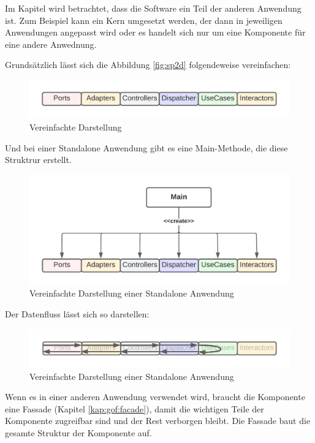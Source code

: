 Im Kapitel wird betrachtet, dass die Software ein Teil der anderen Anwendung ist.
Zum Beispiel kann ein Kern umgesetzt werden, der dann in jeweiligen Anwendungen angepasst wird 
oder es handelt sich nur um eine Komponente für eine andere Anwednung.

Grundsätzlich lässt sich die Abbildung \ref{fig:sp2d} folgendeweise vereinfachen:
\begin{figure}[H]
    \centering
    \includegraphics[width=1\textwidth]{./images/SimpliedArchitecture.png}
    \caption{Vereinfachte Darstellung}
    \label{fig:SimpliedArchitecture}
\end{figure}

Und bei einer Standalone Anwendung gibt es eine Main-Methode, die diese Struktrur erstellt.
\begin{figure}[H]
    \centering
    \includegraphics[width=1\textwidth]{./images/Architecture as Standalone.png}
    \caption{Vereinfachte Darstellung einer Standalone Anwendung}
    \label{fig:SimpliedArchitectureAsStandalone}
\end{figure}

Der Datenfluss lässt sich so darstellen:
\begin{figure}[H]
    \centering
    \includegraphics[width=1\textwidth]{./images/Dataflow.png}
    \caption{Vereinfachte Darstellung einer Standalone Anwendung}
    \label{fig:SimpliedArchitectureDataflow}
\end{figure}

\newpage
Wenn es in einer anderen Anwendung verwendet wird, braucht die Komponente eine Fassade (Kapitel \ref{kap:gof:facade}), damit 
die wichtigen Teile der Komponente zugreifbar sind und der Rest verborgen bleibt. 
Die Fassade baut die gesamte Struktur der Komponente auf.

